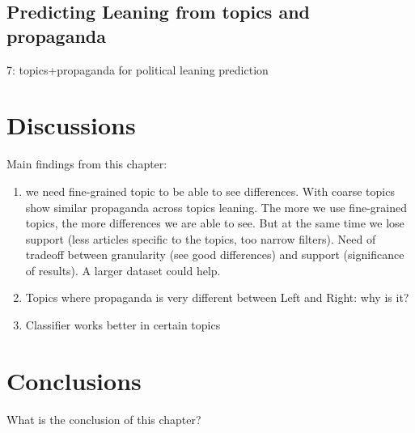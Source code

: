 


\subsection{Predicting Leaning from topics and propaganda}
\label{sec:topic_classifier_propaganda_2}

7: topics+propaganda for political leaning prediction

\section{Discussions}
\label{sec:topic_discussion}

Main findings from this chapter:

\begin{enumerate}
    \item we need fine-grained topic to be able to see differences. With coarse topics show similar propaganda across topics leaning. The more we use fine-grained topics, the more differences we are able to see. But at the same time we lose support (less articles specific to the topics, too narrow filters). Need of tradeoff between granularity (see good differences) and support (significance of results). A larger dataset could help.
    \item Topics where propaganda is very different between Left and Right: why is it?
    \item Classifier works better in certain topics
\end{enumerate}


\section{Conclusions}
\label{sec:topic_conclusion}

What is the conclusion of this chapter?